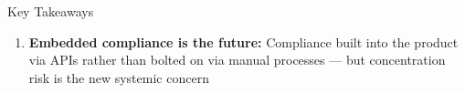 \begin{frame}{Key Takeaways}
\begin{enumerate}
          transaction monitoring, NLP regulatory intelligence, and API-based KYC can
          reduce compliance costs by 30--70\% while improving detection accuracy
    \vspace{0.15em}
    \item \textcolor{mlpurple}{\textbf{Embedded compliance is the future:}}
          Compliance built into the product via APIs rather than bolted on via manual
          processes --- but concentration risk is the new systemic concern
  \end{enumerate}
\end{frame}

